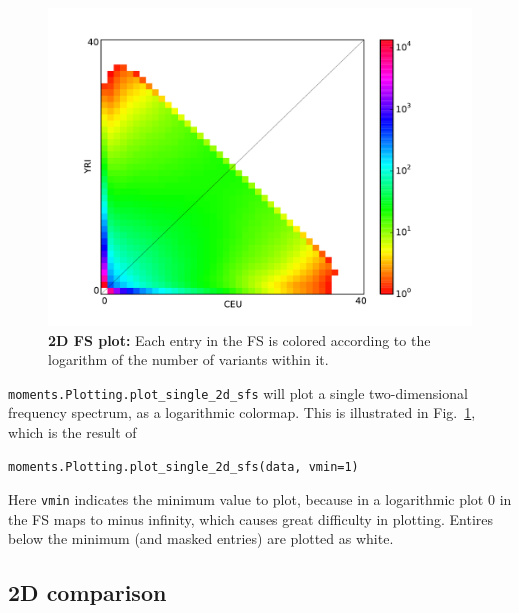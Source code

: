 \documentclass[12pt]{article}
\makeatletter
\newcommand{\py}[1]{\lstinline[language=Python, showstringspaces=False]@#1@}
\makeatother
\begin{document}
\begin{figure}
\centering
\includegraphics[scale=0.3]{2d_single}
\caption{\textbf{2D FS plot:} Each entry in the FS is colored according to the logarithm of the number of variants within it.\label{fig:2d_single}}
\end{figure}

\py{moments.Plotting.plot_single_2d_sfs} will plot a single two-dimensional frequency spectrum, as a logarithmic colormap.
This is illustrated in Fig.~\ref{fig:2d_single}, which is the result of
\begin{lstlisting}
moments.Plotting.plot_single_2d_sfs(data, vmin=1)
\end{lstlisting}
Here \py{vmin} indicates the minimum value to plot, because in a logarithmic plot 0 in the FS maps to minus infinity, which causes great difficulty in plotting.
Entires below the minimum (and masked entries) are plotted as white.

\subsection{2D comparison}
\end{document}
